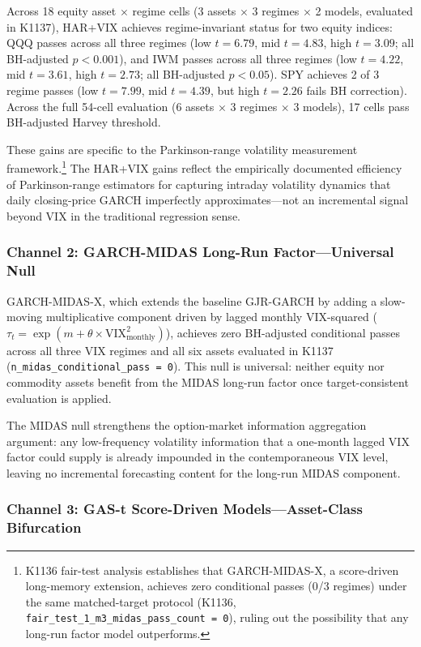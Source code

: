 \documentclass[12pt,a4paper]{article}
\begin{document}
Across 18 equity asset $\times$ regime cells (3 assets $\times$ 3 regimes $\times$ 2 models, evaluated in K1137), HAR+VIX achieves regime-invariant status for two equity indices: QQQ passes across all three regimes (low $t=6.79$, mid $t=4.83$, high $t=3.09$; all BH-adjusted $p < 0.001$), and IWM passes across all three regimes (low $t=4.22$, mid $t=3.61$, high $t=2.73$; all BH-adjusted $p < 0.05$). SPY achieves 2 of 3 regime passes (low $t=7.99$, mid $t=4.39$, but high $t=2.26$ fails BH correction). Across the full 54-cell evaluation (6 assets $\times$ 3 regimes $\times$ 3 models), 17 cells pass BH-adjusted Harvey threshold.

These gains are specific to the Parkinson-range volatility measurement framework.\footnote{K1136 fair-test analysis establishes that GARCH-MIDAS-X, a score-driven long-memory extension, achieves zero conditional passes (0/3 regimes) under the same matched-target protocol (K1136, \texttt{fair\_test\_1\_m3\_midas\_pass\_count = 0}), ruling out the possibility that any long-run factor model outperforms.} The HAR+VIX gains reflect the empirically documented efficiency of Parkinson-range estimators for capturing intraday volatility dynamics that daily closing-price GARCH imperfectly approximates---not an incremental signal beyond VIX in the traditional regression sense.

\subsubsection{Channel 2: GARCH-MIDAS Long-Run Factor---Universal Null}

GARCH-MIDAS-X, which extends the baseline GJR-GARCH by adding a slow-moving multiplicative component driven by lagged monthly VIX-squared ($\tau_t = \exp(m + \theta \times \text{VIX}^2_{\text{monthly}})$), achieves zero BH-adjusted conditional passes across all three VIX regimes and all six assets evaluated in K1137 (\texttt{n\_midas\_conditional\_pass = 0}). This null is universal: neither equity nor commodity assets benefit from the MIDAS long-run factor once target-consistent evaluation is applied.

The MIDAS null strengthens the option-market information aggregation argument: any low-frequency volatility information that a one-month lagged VIX factor could supply is already impounded in the contemporaneous VIX level, leaving no incremental forecasting content for the long-run MIDAS component.

\subsubsection{Channel 3: GAS-t Score-Driven Models---Asset-Class Bifurcation}
\end{document}

